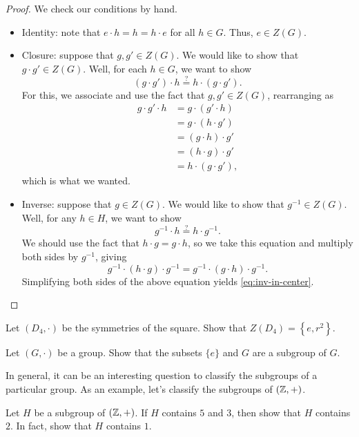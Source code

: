 \documentclass[../notes.tex]{subfiles}
\begin{document}
\begin{proof}
    We check our conditions by hand.
    \begin{itemize}
        \item Identity: note that $e\cdot h=h=h\cdot e$ for all $h\in G$. Thus, $e\in Z(G)$.
        \item Closure: suppose that $g,g'\in Z(G)$. We would like to show that $g\cdot g'\in Z(G)$. Well, for each $h\in G$, we want to show
        \[(g\cdot g')\cdot h\stackrel?=h\cdot(g\cdot g').\]
        For this, we associate and use the fact that $g,g'\in Z(G)$, rearranging as
        \begin{align*}
            g\cdot g'\cdot h &= g\cdot (g'\cdot h) \\
            &= g\cdot(h\cdot g') \\
            &= (g\cdot h)\cdot g' \\
            &= (h\cdot g)\cdot g' \\
            &= h\cdot (g\cdot g'),
        \end{align*}
        which is what we wanted.
        \item Inverse: suppose that $g\in Z(G)$. We would like to show that $g^{-1}\in Z(G)$. Well, for any $h\in H$, we want to show
        \begin{equation}
            g^{-1}\cdot h\stackrel?=h\cdot g^{-1}. \label{eq:inv-in-center}
        \end{equation}
        We should use the fact that $h\cdot g=g\cdot h$, so we take this equation and multiply both sides by $g^{-1}$, giving
        \[g^{-1}\cdot(h\cdot g)\cdot g^{-1}=g^{-1}\cdot(g\cdot h)\cdot g^{-1}.\]
        Simplifying both sides of the above equation yields \eqref{eq:inv-in-center}.
        \qedhere
    \end{itemize}
\end{proof}
\begin{exe}
    Let $(D_4,\cdot)$ be the symmetries of the square. Show that $Z(D_4)=\left\{e,r^2\right\}$.
\end{exe}
\begin{exe} \label{exe:easy-subgroups}
    Let $(G,\cdot)$ be a group. Show that the subsets $\{e\}$ and $G$ are a subgroup of $G$.
\end{exe}
In general, it can be an interesting question to classify the subgroups of a particular group. As an example, let's classify the subgroups of $(\mathbb Z,+)$.
\begin{exe}
    Let $H$ be a subgroup of $(\mathbb Z,+)$. If $H$ contains $5$ and $3$, then show that $H$ contains $2$. In fact, show that $H$ contains $1$.
\end{exe}
\end{document}
